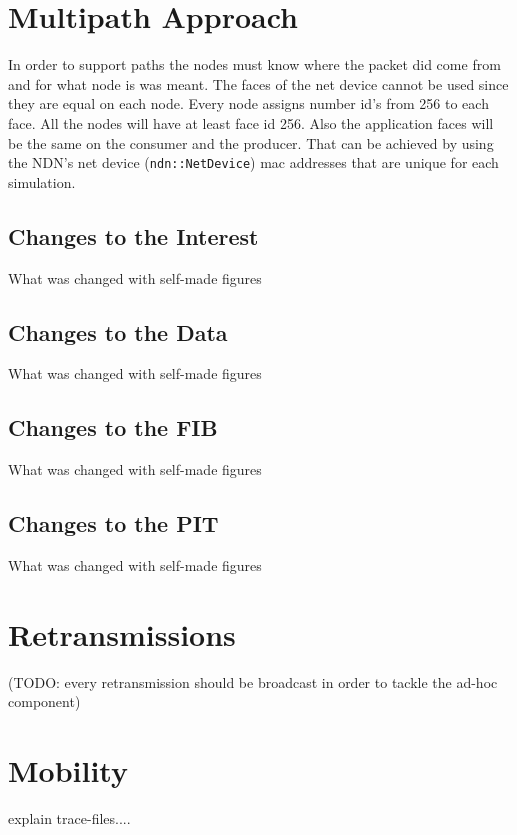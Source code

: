 \section{Multipath Approach}

In order to support paths the nodes must know where the packet did come from and for what node is was meant. The faces of the net device cannot be used since they are equal on each node. Every node assigns number id's from 256 to each face. All the nodes will have at least face id 256. Also the application faces will be the same on the consumer and the producer. That can be achieved by using the NDN's net device (\texttt{ndn::NetDevice}) mac addresses that are unique for each simulation. 

\subsection{Changes to the Interest}

What was changed with self-made figures

\subsection{Changes to the Data}

What was changed with self-made figures

\subsection{Changes to the FIB}

What was changed with self-made figures

\subsection{Changes to the PIT}

What was changed with self-made figures

\section{Retransmissions}

(TODO: every retransmission should be broadcast in order to tackle the ad-hoc component)

\section{Mobility}

explain trace-files....
